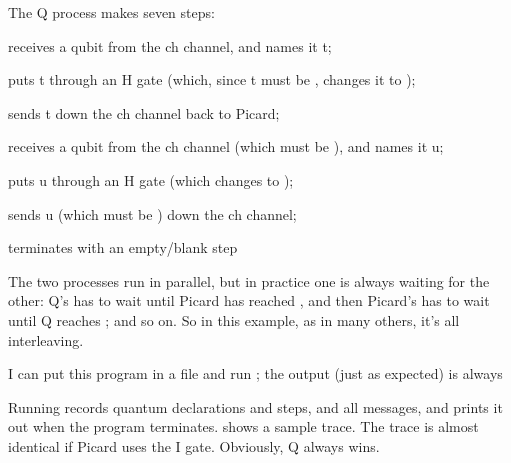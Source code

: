 The Q process makes seven steps: 
\renewcommand{\labelenumi}{Q\theenumi}
\begin{enumerate*}
\item {} receives a qubit from the ch channel, and names it t;
\item {} puts t through an H gate (which, since t must be \zero{}, changes it to \plus{}); 
\item {} sends t down the ch channel back to Picard; 
\item {} receives a qubit from the ch channel (which must be \plus{}), and names it u;
\item {} puts u through an H gate (which changes \plus{} to \zero{});
\item {} sends u (which must be \zero{}) down the ch channel; 
\item terminates with an empty/blank step
\end{enumerate*}
\renewcommand{\labelenumi}{\theenumi}

The two processes run in parallel, but in practice one is always waiting for the other: Q's  has to wait until Picard has reached , and then Picard's  has to wait until Q reaches ; and so on. So in this example, as in many others, it's all interleaving.

 
I can put this program in a file  and run ; the output (just as expected) is always 
\begin{quote}
\end{quote}
Running  records quantum declarations and steps, and all messages, and prints it out when the program terminates.  shows a sample trace. The trace is almost identical if Picard uses the I gate. Obviously, Q always wins.

